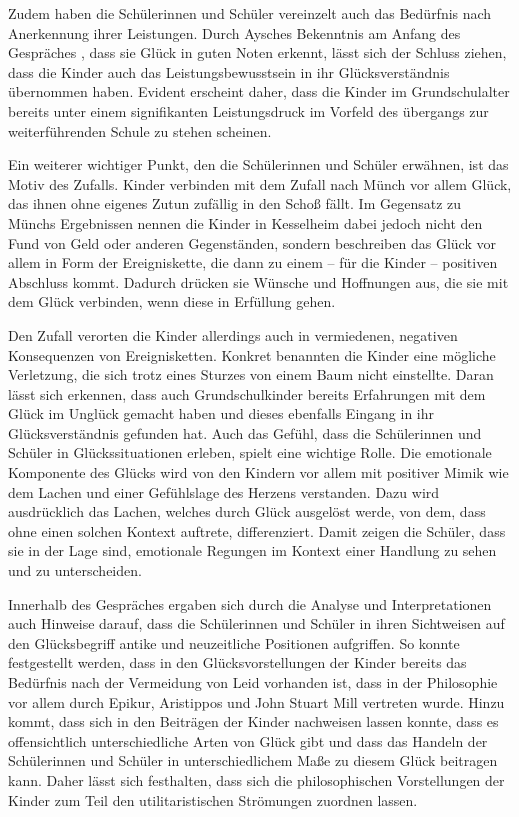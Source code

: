 Zudem haben die Schülerinnen und Schüler vereinzelt auch das Bedürfnis nach Anerkennung ihrer Leistungen. 
Durch Aysches Bekenntnis am Anfang des Gespräches , dass sie Glück in guten Noten erkennt,  lässt sich der Schluss ziehen, dass die Kinder auch das Leistungsbewusstsein in ihr Glücksverständnis übernommen haben. 
Evident erscheint daher, dass die Kinder im Grundschulalter bereits unter einem signifikanten Leistungsdruck im Vorfeld des übergangs zur weiterführenden Schule zu stehen scheinen. 

Ein weiterer wichtiger Punkt, den die Schülerinnen und Schüler erwähnen, ist das Motiv des Zufalls. 
Kinder verbinden mit dem Zufall nach Münch vor allem Glück, \glqq das ihnen ohne eigenes Zutun zufällig in den Schoß fällt.\grqq{}\cite[S.\,62]{JM11}
Im Gegensatz zu Münchs Ergebnissen nennen die Kinder in Kesselheim dabei jedoch nicht den Fund von Geld oder anderen Gegenständen, sondern beschreiben das Glück vor allem in Form der Ereigniskette, die dann zu einem -- für die Kinder -- positiven Abschluss kommt. 
Dadurch drücken sie Wünsche und Hoffnungen aus, die sie mit dem Glück verbinden, wenn diese in Erfüllung gehen. 

Den Zufall verorten die Kinder allerdings auch in vermiedenen, negativen Konsequenzen von Ereignisketten. 
Konkret benannten die Kinder eine mögliche Verletzung, die sich trotz eines Sturzes von einem Baum nicht einstellte. 
Daran lässt sich erkennen, dass auch Grundschulkinder bereits Erfahrungen mit dem Glück im Unglück gemacht haben und dieses ebenfalls Eingang in ihr Glücksverständnis gefunden hat.
Auch das Gefühl, dass die Schülerinnen und Schüler in Glückssituationen erleben, spielt eine wichtige Rolle. 
Die emotionale Komponente des Glücks wird von den Kindern vor allem mit positiver Mimik wie dem Lachen und einer Gefühlslage des Herzens verstanden. 
Dazu wird ausdrücklich das Lachen, welches durch Glück ausgelöst werde, von dem, dass ohne einen solchen Kontext auftrete, differenziert. 
Damit zeigen die Schüler, dass sie in der Lage sind, emotionale Regungen im Kontext einer Handlung zu sehen und zu unterscheiden. 

Innerhalb des Gespräches ergaben sich durch die Analyse und Interpretationen auch Hinweise darauf, dass die Schülerinnen und Schüler in ihren Sichtweisen auf den Glücksbegriff antike und neuzeitliche Positionen aufgriffen. 
So konnte festgestellt werden, dass in den Glücksvorstellungen der Kinder bereits das Bedürfnis nach der Vermeidung von Leid vorhanden ist, dass in der Philosophie vor allem durch Epikur, Aristippos und John Stuart Mill vertreten wurde. 
Hinzu kommt, dass sich in den Beiträgen der Kinder nachweisen lassen konnte, dass es offensichtlich unterschiedliche Arten von Glück gibt und dass das Handeln der Schülerinnen und Schüler in unterschiedlichem Maße zu diesem Glück beitragen kann. 
Daher lässt sich festhalten, dass sich die philosophischen Vorstellungen der Kinder zum Teil den utilitaristischen Strömungen zuordnen lassen. 

